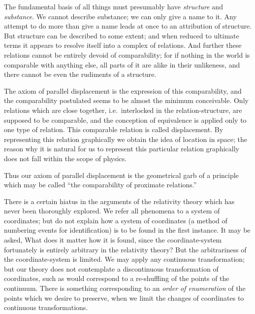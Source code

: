 \documentclass[12pt]{book}
\begin{document}
The fundamental basis of all things must presumably have \emph{structure} and
\emph{substance}. We cannot describe substance; we can only give a name to it.
Any attempt to do more than give a name leads at once to an attribution of
structure. But structure can be described to some extent; and when reduced
to ultimate terms it appears to resolve itself into a complex of relations. And
further these relations cannot be entirely devoid of comparability; for if
nothing in the world is comparable with anything else, all parts of it are alike
in their unlikeness, and there cannot be even the rudiments of a structure.

The axiom of parallel displacement is the expression of this comparability,
and the comparability postulated seems to be almost the minimum conceivable.
Only relations which are close together, i.e.\ interlocked in the relation-structure,
are supposed to be comparable, and the conception of equivalence
is applied only to one type of relation. This comparable relation is called
displacement. By representing this relation graphically we obtain the idea of
location in space; the reason why it is natural for us to represent this particular
relation graphically does not fall within the scope of physics.

Thus our axiom of parallel displacement is the geometrical garb of a
principle which may be called ``the comparability of proximate relations.''
%

There is a certain hiatus in the arguments of the relativity theory which
has never been thoroughly explored. We refer all phenomena to a system of
coordinates; but do not explain how a system of coordinates (a method of
%
numbering events for identification) is to be found in the first instance. It
may be asked, What does it matter how it is found, since the coordinate-system
fortunately is entirely arbitrary in the relativity theory? But the
arbitrariness of the coordinate-system is limited. We may apply any continuous
transformation; but our theory does not contemplate a discontinuous
transformation of coordinates, such as would correspond to a re-shuffling of
%
the points of the continuum. There is something corresponding to an \emph{order of
enumeration} of the points which we desire to preserve, when we limit the
changes of coordinates to continuous transformations.
\end{document}

